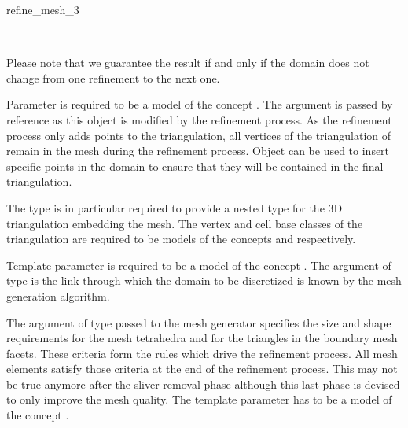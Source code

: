 \begin{ccRefFunction}{refine_mesh_3}
\begin{ccAdvanced}
\\

Please note that we guarantee the result if and only if the domain does
not change from one refinement to the next one.
\end{ccAdvanced}


\ccParameters

Parameter  is required to be a model of
the concept 
.
The argument  is passed by
reference as this object is modified by the refinement process. As the
refinement process only adds points to the triangulation, all 
vertices of the triangulation of  remain in the
mesh during the refinement process. Object  can be used to insert
specific points in the domain to ensure that they will be contained in the
final triangulation.

The type  is in particular required to provide a nested type
 for the 3D triangulation
embedding the mesh. The vertex and cell base classes of the
triangulation  are required to be models of the
concepts  and 
respectively.

Template parameter  is required to be a model of
the concept  . The argument  of type
 is the link through which the domain
to be discretized is known  by the mesh generation algorithm. 



The argument of
type  passed to the mesh generator specifies the
size and shape requirements for the mesh tetrahedra
and for the triangles in the boundary mesh facets. These criteria
form the rules which drive the refinement process. All mesh elements
satisfy those criteria at the end of the refinement process.
This may not be true anymore after the sliver removal phase although this
last phase is devised to only improve the mesh quality.
The template parameter  has to be a model of the concept
. 


\end{ccRefFunction}
